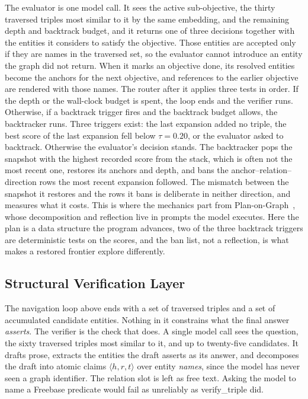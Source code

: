 The evaluator is one model call. It sees the active sub-objective, the
thirty traversed triples most similar to it by the same embedding, and
the remaining depth and backtrack budget, and it returns one of three
decisions together with the entities it considers to satisfy the
objective. Those entities are accepted only if they are names in the
traversed set, so the evaluator cannot introduce an entity the graph did
not return. When it marks an objective done, its resolved entities
become the anchors for the next objective, and references to the earlier
objective are rendered with those names. The router after it applies
three tests in order. If the depth or the wall-clock budget is spent,
the loop ends and the verifier runs. Otherwise, if a backtrack trigger
fires and the backtrack budget allows, the backtracker runs. Three
triggers exist: the last expansion added no triple, the best score of
the last expansion fell below $\tau = 0.20$, or the evaluator asked to
backtrack. Otherwise the evaluator's decision stands. The backtracker
pops the snapshot with the highest recorded score from the stack, which
is often not the most recent one, restores its anchors and depth, and
bans the anchor--relation--direction rows the most recent expansion
followed. The mismatch between the snapshot it restores and the rows it
bans is deliberate in neither direction, and  measures
what it costs. This is where the mechanics part from
Plan-on-Graph~\cite{chen2024plan}, whose decomposition and reflection
live in prompts the model executes. Here the plan is a data structure
the program advances, two of the three backtrack triggers are
deterministic tests on the scores, and the ban list, not a reflection,
is what makes a restored frontier explore differently.

\subsection{Structural Verification Layer}\label{sec:verification}

The navigation loop above ends with a set of traversed triples and a set
of accumulated candidate entities. Nothing in it constrains what the
final answer \emph{asserts}. The verifier is the check that does. A
single model call sees the question, the sixty traversed triples most
similar to it, and up to twenty-five candidates. It drafts prose,
extracts the entities the draft asserts as its answer, and decomposes
the draft into atomic claims $\langle h, r, t \rangle$ over entity
\emph{names}, since the model has never seen a graph identifier. The
relation slot is left as free text. Asking the model to name a Freebase
predicate would fail as unreliably as \textsf{verify\_triple} did.

